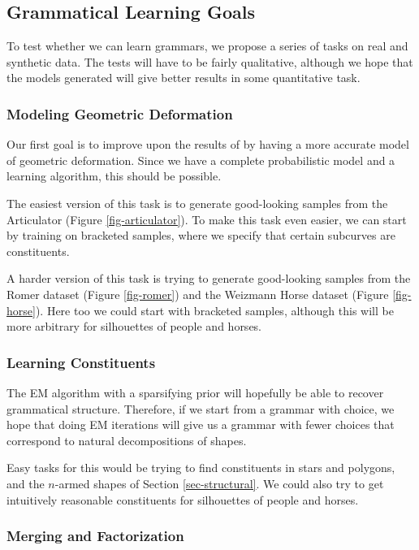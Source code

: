 \documentclass{article}
\begin{document}
\subsection{Grammatical Learning Goals}

To test whether we can learn grammars, we propose a series of tasks on
real and synthetic data. The tests will have to be fairly qualitative,
although we hope that the models generated will give better results in
some quantitative task.

\subsubsection{Modeling Geometric Deformation}

Our first goal is to improve upon the results of \cite{hcm} by having
a more accurate model of geometric deformation. Since we have a
complete probabilistic model and a learning algorithm, this should be
possible.

The easiest version of this task is to generate good-looking samples
from the Articulator (Figure \ref{fig-articulator}). To make this task
even easier, we can start by training on bracketed samples, where we
specify that certain subcurves are constituents.

A harder version of this task is trying to generate good-looking
samples from the Romer dataset (Figure \ref{fig-romer}) and the
Weizmann Horse dataset (Figure \ref{fig-horse}). Here too we could
start with bracketed samples, although this will be more arbitrary for
silhouettes of people and horses.

\subsubsection{Learning Constituents}

The EM algorithm with a sparsifying prior will hopefully be able to
recover grammatical structure. Therefore, if we start from a grammar
with choice, we hope that doing EM iterations will give us a grammar
with fewer choices that correspond to natural decompositions of
shapes.

Easy tasks for this would be trying to find constituents in stars and
polygons, and the $n$-armed shapes of Section \ref{sec-structural}. We
could also try to get intuitively reasonable constituents for
silhouettes of people and horses.

\subsubsection{Merging and Factorization}
\end{document}
